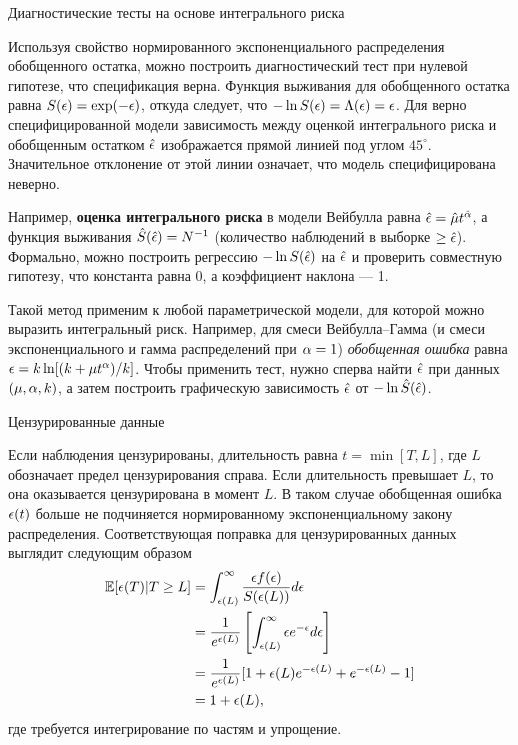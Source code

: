         \begin{center}{Диагностические тесты на основе интегрального риска}\end{center}
        \noindent
Используя свойство нормированного экспоненциального распределения обобщенного остатка, можно построить диагностический тест при нулевой гипотезе, что спецификация верна. Функция выживания для обобщенного остатка равна $S(\epsilon) = \exp(-\epsilon)$, откуда следует, что $-\ln S(\epsilon) = \Lambda(\epsilon) = \epsilon$. Для верно специфицированной модели зависимость между оценкой интегрального риска и обобщенным остатком $\hat{\epsilon}$ изображается прямой линией под углом $45^{\circ}$. Значительное отклонение от этой линии означает, что модель специфицирована неверно.

Например, \textbf{оценка интегрального риска} в модели Вейбулла равна $\hat{\epsilon} = \hat{\mu}t^{\hat{\alpha}}$, а функция выживания $\hat{S}(\hat{\epsilon}) = N^{-1}$ (количество наблюдений в выборке $\ge \hat{\epsilon}$). Формально, можно построить регрессию $-\ln S(\hat{\epsilon})$ на $\hat{\epsilon}$ и проверить совместную гипотезу, что константа равна 0, а коэффициент наклона --- 1.

Такой метод применим к любой параметрической модели, для которой можно выразить интегральный риск. Например, для смеси Вейбулла--Гамма (и смеси экспоненциального и гамма распределений при $\alpha = 1$) \textit{обобщенная ошибка} равна $\epsilon = k\ln[(k + \mu t^{\alpha})/k]$. Чтобы применить тест, нужно сперва найти $\hat{\epsilon}$ при данных $(\mu,\alpha,k)$, а затем построить графическую зависимость $\hat{\epsilon}$ от $-\ln \hat{S}(\hat{\epsilon})$.


        \begin{center}{Цензурированные данные}\end{center}
        \noindent
Если наблюдения цензурированы, длительность равна $t = \min[T,L]$, где $L$ обозначает предел цензурирования справа. Если длительность превышает $L$, то она оказывается цензурирована в момент $L$. В таком случае обобщенная ошибка $\epsilon(t)$ больше не подчиняется нормированному экспоненциальному закону распределения. Соответствующая поправка для цензурированных данных выглядит следующим образом
    \begin{align}
        \label{eq:18.35}
        \mathbb{E}[\epsilon(T)|T\ge L] &= \int^{\infty}_{\epsilon(L)}\frac{\epsilon f(\epsilon)}{S(\epsilon (L))} d\epsilon \notag \\
                           &= \frac{1}{e^{\epsilon(L)}}\left[ \int^{\infty}_{\epsilon(L)} \epsilon e^{-\epsilon} d\epsilon \right] \notag \\
                           &= \frac{1}{e^{\epsilon(L)}}[1 + \epsilon(L)e^{-\epsilon(L)} + e^{-\epsilon(L)} - 1] \notag \\
                           &= 1 + \epsilon(L),
    \end{align}
где требуется интегрирование по частям и упрощение.


